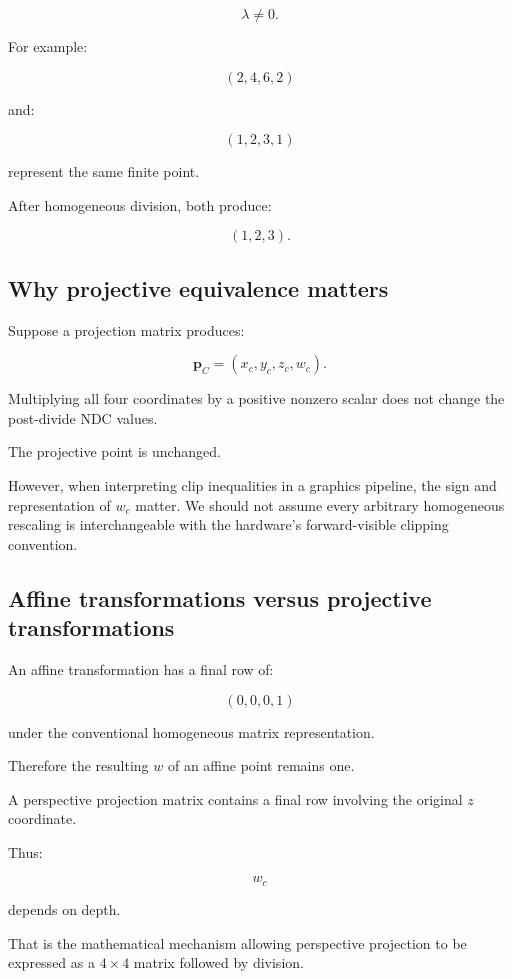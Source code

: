 \[
 \lambda\ne0.
\]

For example:

\[
 (2,4,6,2)
\]

and:

\[
 (1,2,3,1)
\]

represent the same finite point.

After homogeneous division, both produce:

\[
 (1,2,3).
\]

\subsection{Why projective equivalence matters}\label{02-foundations-ii-ch033-why-projective-equivalence-matters}

Suppose a projection matrix produces:

\[
 \mathbf p_C=(x_c,y_c,z_c,w_c).
\]

Multiplying all four coordinates by a positive nonzero scalar does not change the post-divide NDC values.

The projective point is unchanged.

However, when interpreting clip inequalities in a graphics pipeline, the sign and representation of \(w_c\) matter. We should not assume every arbitrary homogeneous rescaling is interchangeable with the hardware's forward-visible clipping convention.

\subsection{Affine transformations versus projective transformations}\label{02-foundations-ii-ch033-affine-transformations-versus-projective-transformations}

An affine transformation has a final row of:

\[
 (0,0,0,1)
\]

under the conventional homogeneous matrix representation.

Therefore the resulting \(w\) of an affine point remains one.

A perspective projection matrix contains a final row involving the original \(z\) coordinate.

Thus:

\[
 w_c
\]

depends on depth.

That is the mathematical mechanism allowing perspective projection to be expressed as a \(4\times4\) matrix followed by division.

